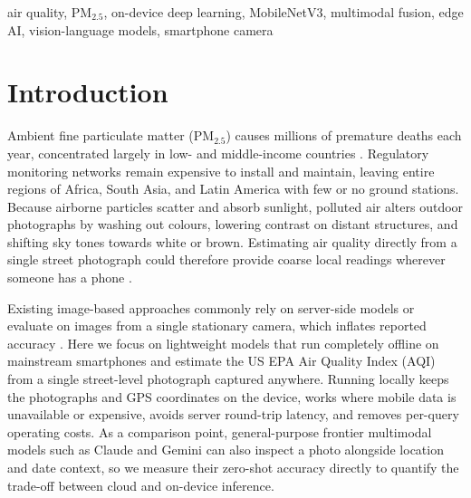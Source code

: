 \documentclass[conference]{IEEEtran}
\newcommand{\pmtwofive}{PM$_{2.5}$}
\begin{document}
\begin{IEEEkeywords}
air quality, \pmtwofive, on-device deep learning, MobileNetV3, multimodal fusion, edge AI, vision-language models, smartphone camera
\end{IEEEkeywords}

\section{Introduction}

Ambient fine particulate matter (\pmtwofive) causes millions of premature deaths
each year, concentrated largely in low- and middle-income countries
\cite{who2024airquality}. Regulatory monitoring networks remain expensive to
install and maintain, leaving entire regions of Africa, South Asia, and Latin
America with few or no ground stations. Because airborne particles scatter and
absorb sunlight, polluted air alters outdoor photographs by washing out colours,
lowering contrast on distant structures, and shifting sky tones towards white or
brown. Estimating air quality directly from a single street photograph could
therefore provide coarse local readings wherever someone has a phone
\cite{wangLightweightAirQuality2024,kambleMobileImageDrivenPM252025}.

Existing image-based approaches commonly rely on server-side models or evaluate
on images from a single stationary camera, which inflates reported accuracy
\cite{bylerLocationGeneralizabilityImageBased2025,nathvaniHereNowEvaluating2023}.
Here we focus on lightweight models that run completely offline on mainstream
smartphones and estimate the US EPA Air Quality Index (AQI) from a single
street-level photograph captured anywhere. Running locally keeps the photographs and
GPS coordinates on the device, works where mobile data is unavailable or
expensive, avoids server round-trip latency, and removes per-query operating
costs. As a comparison point, general-purpose frontier multimodal models such as
Claude and Gemini can also inspect a photo alongside location and date context,
so we measure their zero-shot accuracy directly to quantify the trade-off
between cloud and on-device inference.
\end{document}
